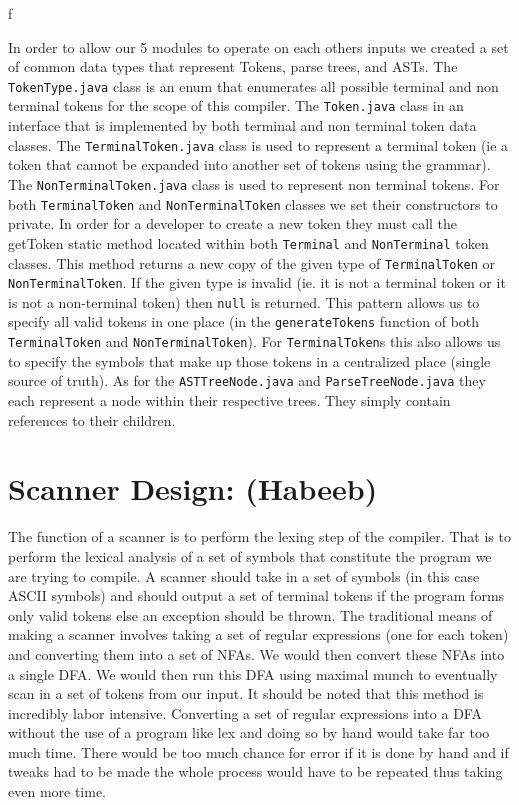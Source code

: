 f\documentclass[12pt]{article}
\begin{document}
In order to allow our 5 modules to operate on each others inputs we created a set of common data
types that represent Tokens, parse trees, and ASTs. The \texttt{TokenType.java} class is an enum
that enumerates all possible terminal and non terminal tokens for the scope of this compiler. The
\texttt{Token.java} class in an interface that is implemented by both terminal and non terminal
token data classes. The \texttt{TerminalToken.java} class is used to represent a terminal token (ie
a token that cannot be expanded into another set of tokens using the grammar). The
\texttt{NonTerminalToken.java} class is used to represent non terminal tokens. For both
\texttt{TerminalToken} and \texttt{NonTerminalToken} classes we set their constructors to private.
In order for a developer to create a new token they must call the getToken static method located
within both \texttt{Terminal} and \texttt{NonTerminal} token classes. This method returns a new copy
of the given type of \texttt{TerminalToken} or \texttt{NonTerminalToken}. If the given type is
invalid (ie. it is not a terminal token or it is not a non-terminal token) then \texttt{null} is
returned. This pattern allows us to specify all valid tokens in one place (in the
\texttt{generateTokens} function of both \texttt{TerminalToken} and \texttt{NonTerminalToken}). For
\texttt{TerminalToken}s this also allows us to specify the symbols that make up those tokens in a
centralized place (single source of truth). As for the \texttt{ASTTreeNode.java} and
\texttt{ParseTreeNode.java} they each represent a node within their respective trees. They simply
contain references to their children.

\section*{Scanner Design: (Habeeb)}

The function of a scanner is to perform the lexing step of the compiler. That is to perform the
lexical analysis of a set of symbols that constitute the program we are trying to compile. A scanner
should take in a set of symbols (in this case ASCII symbols) and should output a set of terminal
tokens if the program forms only valid tokens else an exception should be thrown.	 The traditional
means of making a scanner involves taking a set of regular expressions (one for each token) and
converting them into a set of NFAs. We would then convert these NFAs into a single DFA. We would
then run this DFA using maximal munch to eventually scan in a set of tokens from our input. It
should be noted that this method is incredibly labor intensive. Converting a set of regular
expressions into a DFA without the use of a program like lex and doing so by hand would take far too
much time. There would be too much chance for error if it is done by hand and if tweaks had to be
made the whole process would have to be repeated thus taking even more time.
\end{document}
